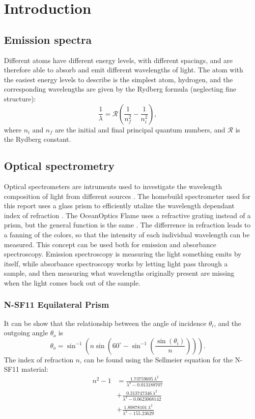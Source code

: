 \chapter{Introduction}
\section{Emission spectra}
Different atoms have different energy levels, with different spacings,
and are therefore able to absorb and emit different wavelengths of light.
The atom with the easiest energy levels to describe is the simplest atom, hydrogen,
and the corresponding wavelengths are given by the Rydberg formula (neglecting fine structure):
\begin{equation}
    \frac{1}{\lambda} = \mathcal{R} (\frac{1}{n_f^2} - \frac{1}{n_i^2}), \label{eq:Rydberg}
\end{equation}
where $n_i$ and $n_f$ are the initial and final principal quantum numbers, and $\mathcal{R}$ is the Rydberg constant.
\section{Optical spectrometry}
Optical spectrometers are intruments used to investigate the wavelength composition of light from different sources \autocite{PaschottaSpectrometers} .
The homebuild spectrometer used for this report uses a glass prism to efficiently utalize the wavelength dependant index of refraction\autocite{PaschottaRefractiveIndex} .
The OceanOptics Flame \autocite{OcOptFlameManual2016} uses a refractive grating instead of a prism, but the general function is the same\autocite{PaschottaDiffractionGratings} .
The differrence in refraction leads to a fanning of the colors, so that the intensity of each individual wavelength can be measured.
This concept can be used both for emission and absorbance spectroscopy.
Emission spectroscopy is measuring the light something emits by itself,
while absorbance spectroscopy works by letting light pass through a sample, 
and then measuring what wavelengths originally present are missing when the light comes back out of the sample.
\subsection{N-SF11 Equilateral Prism}
It can be show that the relationship between the angle of incidence $\theta_i$, and the outgoing angle  $\theta_o $ is
\begin{equation}
    \theta_o = \sin^{-1} \left(  n \sin\left( 60^\circ - \sin^{-1}\left(\frac{\sin(\theta_i)}{n} \right) \right) \right). \label{eq:Diffraction}
\end{equation}
The index of refraction $n$, can be found using the Sellmeier equation for the N-SF11 material:
\begin{align}
    n^2 - 1 &= \frac{1.73759695\,\lambda^2}{\lambda^2 - 0.013188707} \nonumber \\
&+ \frac{0.313747346\,\lambda^2}{\lambda^2 - 0.0623068142} \nonumber \\
&+ \frac{1.89878101\,\lambda^2}{\lambda^2 - 155.23629} \label{eq:Sellmeier} 
\end{align}

